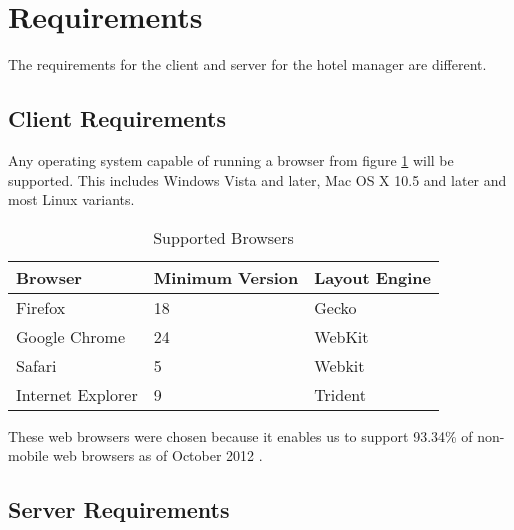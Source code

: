 \section{Requirements}

The requirements for the client and server for the hotel manager are different.

\subsection{Client Requirements}
Any operating system capable of running a browser from figure \ref{supportedBrowsers} will be supported. This includes Windows Vista and later, Mac OS X 10.5 and later and most Linux variants.
\begin{table}[ht]
	\centering
	\begin{tabular}{|l|l|l|}
		\hline
		\textbf{Browser} & \textbf{Minimum Version} & \textbf{Layout Engine} \\
		\hline
		Firefox & 18 & Gecko \\
		\hline
		Google Chrome & 24 & WebKit \\
		\hline
		Safari & 5 & Webkit \\
		\hline
		Internet Explorer & 9 & Trident \\
		\hline
	\end{tabular}
	\caption{Supported Browsers}
	\label{supportedBrowsers}
\end{table}

These web browsers were chosen because it enables us to support 93.34\% of non-mobile web browsers as of October 2012 \cite{usageShare}. 

\subsection{Server Requirements}

